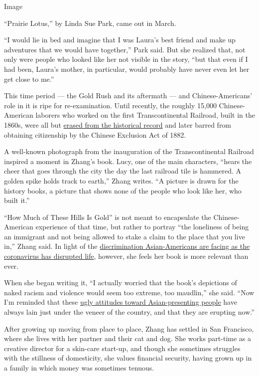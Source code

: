 Image

``Prairie Lotus,'' by Linda Sue Park, came out in March.

``I would lie in bed and imagine that I was Laura's best friend and make
up adventures that we would have together,'' Park said. But she realized
that, not only were people who looked like her not visible in the story,
``but that even if I had been, Laura's mother, in particular, would
probably have never even let her get close to me.''

This time period --- the Gold Rush and its aftermath --- and
Chinese-Americans' role in it is ripe for re-examination. Until
recently, the roughly 15,000 Chinese-American laborers who worked on the
first Transcontinental Railroad, built in the 1860s, were all but
\href{https://www.nytimes.com/2019/05/14/us/golden-spike-utah-railroad-150th-anniversary.html}{erased
from the historical record} and later barred from obtaining citizenship
by the Chinese Exclusion Act of 1882.

A well-known photograph from the inauguration of the Transcontinental
Railroad inspired a moment in Zhang's book. Lucy, one of the main
characters, ``hears the cheer that goes through the city the day the
last railroad tile is hammered. A golden spike holds track to earth,''
Zhang writes. ``A picture is drawn for the history books, a picture that
shows none of the people who look like her, who built it.''

``How Much of These Hills Is Gold'' is not meant to encapsulate the
Chinese-American experience of that time, but rather to portray ``the
loneliness of being an immigrant and not being allowed to stake a claim
to the place that you live in,'' Zhang said. In light of the
\href{https://www.nytimes.com/2020/03/23/us/chinese-coronavirus-racist-attacks.html}{discrimination
Asian-Americans are facing as the coronavirus has disrupted life},
however, she feels her book is more relevant than ever.

When she began writing it, ``I actually worried that the book's
depictions of naked racism and violence would seem too extreme, too
maudlin,'' she said. ``Now I'm reminded that these
\href{https://www.nytimes.com/2020/03/29/us/politics/coronavirus-asian-americans.html}{ugly
attitudes toward Asian-presenting people} have always lain just under
the veneer of the country, and that they are erupting now.''

After growing up moving from place to place, Zhang has settled in San
Francisco, where she lives with her partner and their cat and dog. She
works part-time as a creative director for a skin-care start-up, and
though she sometimes struggles with the stillness of domesticity, she
values financial security, having grown up in a family in which money
was sometimes tenuous.

